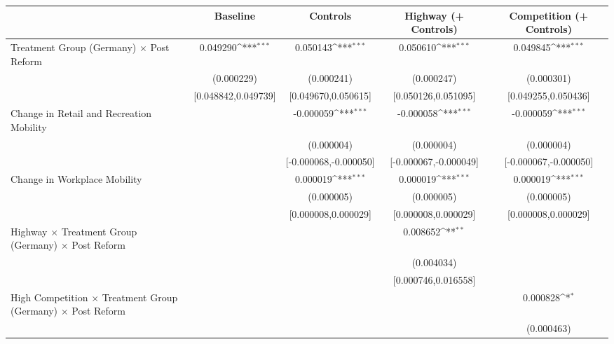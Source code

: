 {
\def\sym#1{\ifmmode^{#1}\else\(^{#1}\)\fi}
\begin{tabular}{l*{4}{c}}
\toprule
                    &\multicolumn{1}{c}{Baseline}&\multicolumn{1}{c}{Controls}&\multicolumn{1}{c}{Highway (+ Controls)}&\multicolumn{1}{c}{Competition (+ Controls)}\\
\midrule
Treatment Group (Germany) $\times$ Post Reform&    0.049290\sym{***}&    0.050143\sym{***}&    0.050610\sym{***}&    0.049845\sym{***}\\
                    &  (0.000229)         &  (0.000241)         &  (0.000247)         &  (0.000301)         \\
                    &[0.048842,0.049739]         &[0.049670,0.050615]         &[0.050126,0.051095]         &[0.049255,0.050436]         \\
Change in Retail and Recreation Mobility&                     &   -0.000059\sym{***}&   -0.000058\sym{***}&   -0.000059\sym{***}\\
                    &                     &  (0.000004)         &  (0.000004)         &  (0.000004)         \\
                    &                     &[-0.000068,-0.000050]         &[-0.000067,-0.000049]         &[-0.000067,-0.000050]         \\
Change in Workplace Mobility&                     &    0.000019\sym{***}&    0.000019\sym{***}&    0.000019\sym{***}\\
                    &                     &  (0.000005)         &  (0.000005)         &  (0.000005)         \\
                    &                     &[0.000008,0.000029]         &[0.000008,0.000029]         &[0.000008,0.000029]         \\
Highway $\times$ Treatment Group (Germany) $\times$ Post Reform&                     &                     &    0.008652\sym{**} &                     \\
                    &                     &                     &  (0.004034)         &                     \\
                    &                     &                     &[0.000746,0.016558]         &                     \\
High Competition $\times$ Treatment Group (Germany) $\times$ Post Reform&                     &                     &                     &    0.000828\sym{*}  \\
                    &                     &                     &                     &  (0.000463)         \\

\end{tabular}}
